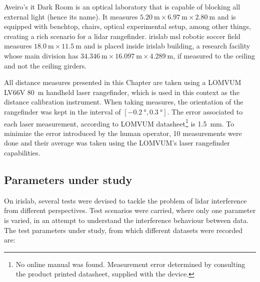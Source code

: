 Aveiro's \ac{it} Dark Room is an optical laboratory that is capable of blocking all external light (hence its name). It measures $\SI{5.20}{\meter} \times \SI{6.97}{\meter} \times \SI{2.80}{\meter}$ and is equipped with benchtop, chairs, optical experimental setup, among other things, creating a rich scenario for a \ac{lidar} rangefinder. 
\ac{irislab} \ac{msl} robotic soccer field measures $\SI{18.0}{\meter} \times \SI{11.5}{\meter}$ and is placed inside \ac{irislab} building, a research facility whose main division has $\SI{34.346}{\meter} \times \SI{16.097}{\meter} \times \SI{4.289}{\meter}$, if measured to the ceiling and not the ceiling girders. 

All distance measures presented in this Chapter are taken using a LOMVUM LV66V \SI{80}{\meter} handheld laser rangefinder, which is used in this context as the distance calibration instrument. When taking measures, the orientation of the rangefinder was kept in the interval of $[\SI{-0.2}{\degree}, \SI{0.3}{\degree}]$. The error associated to each laser measurement, according to LOMVUM datasheet\footnote{No online manual was found. Measurement error determined by consulting the product printed datasheet, supplied with the device.} is \SI{1.5}{\milli\meter}. To minimize the error introduced by the human operator, 10 measurements were done and their average was taken using the LOMVUM's laser rangefinder capabilities.


\subsection{Parameters under study}
\label{subsec:lidar-interference:parameters-under-test}
On \ac{irislab}, several tests were devised to tackle the problem of \ac{lidar} interference from different perspectives. Test scenarios were carried, where only one parameter is varied, in an attempt to understand the interference behaviour between data. The test parameters under study, from which different datasets were recorded are:


